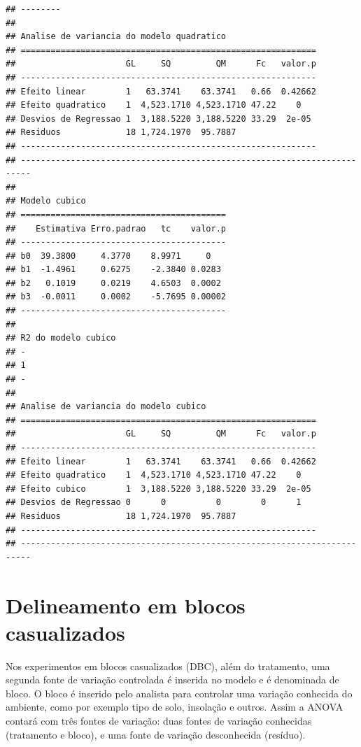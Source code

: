 \documentclass[
]{article}
\begin{document}
\begin{verbatim}
## --------
## 
## Analise de variancia do modelo quadratico
## ===========================================================
##                      GL     SQ         QM      Fc   valor.p
## -----------------------------------------------------------
## Efeito linear        1   63.3741    63.3741   0.66  0.42662
## Efeito quadratico    1  4,523.1710 4,523.1710 47.22    0   
## Desvios de Regressao 1  3,188.5220 3,188.5220 33.29  2e-05 
## Residuos             18 1,724.1970  95.7887                
## -----------------------------------------------------------
## ------------------------------------------------------------------------
## 
## Modelo cubico
## =========================================
##    Estimativa Erro.padrao   tc    valor.p
## -----------------------------------------
## b0  39.3800     4.3770    8.9971     0   
## b1  -1.4961     0.6275    -2.3840 0.0283 
## b2   0.1019     0.0219    4.6503  0.0002 
## b3  -0.0011     0.0002    -5.7695 0.00002
## -----------------------------------------
## 
## R2 do modelo cubico
## -
## 1
## -
## 
## Analise de variancia do modelo cubico
## ===========================================================
##                      GL     SQ         QM      Fc   valor.p
## -----------------------------------------------------------
## Efeito linear        1   63.3741    63.3741   0.66  0.42662
## Efeito quadratico    1  4,523.1710 4,523.1710 47.22    0   
## Efeito cubico        1  3,188.5220 3,188.5220 33.29  2e-05 
## Desvios de Regressao 0      0          0        0      1   
## Residuos             18 1,724.1970  95.7887                
## -----------------------------------------------------------
## ------------------------------------------------------------------------
\end{verbatim}

\hypertarget{delineamento-em-blocos-casualizados}{%
\section{Delineamento em blocos casualizados}\label{delineamento-em-blocos-casualizados}}

Nos experimentos em blocos casualizados (DBC), além do tratamento, uma segunda fonte de variação controlada é inserida no modelo e é denominada de bloco. O bloco é inserido pelo analista para controlar uma variação conhecida do ambiente, como por exemplo tipo de solo, insolação e outros. Assim a ANOVA contará com três fontes de variação: duas fontes de variação conhecidas (tratamento e bloco), e uma fonte de variação desconhecida (resíduo).
\end{document}
